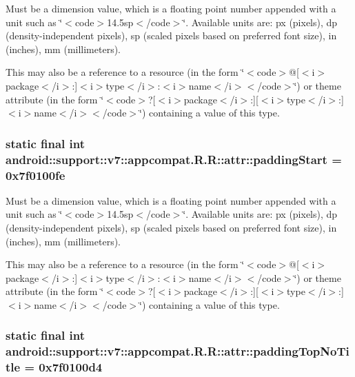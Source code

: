 Must be a dimension value, which is a floating point number appended with a unit such as \char`\"{}$<$code$>$14.5sp$<$/code$>$\char`\"{}. Available units are: px (pixels), dp (density-independent pixels), sp (scaled pixels based on preferred font size), in (inches), mm (millimeters). 

This may also be a reference to a resource (in the form \char`\"{}$<$code$>$@\mbox{[}$<$i$>$package$<$/i$>$:\mbox{]}$<$i$>$type$<$/i$>$:$<$i$>$name$<$/i$>$$<$/code$>$\char`\"{}) or theme attribute (in the form \char`\"{}$<$code$>$?\mbox{[}$<$i$>$package$<$/i$>$:\mbox{]}\mbox{[}$<$i$>$type$<$/i$>$:\mbox{]}$<$i$>$name$<$/i$>$$<$/code$>$\char`\"{}) containing a value of this type. \hypertarget{classandroid_1_1support_1_1v7_1_1appcompat_1_1_r_1_1attr_4bac40afcb95edc302f74bfa5df72085}{
\subsubsection[{paddingStart}]{\setlength{\rightskip}{0pt plus 5cm}static final int android::support::v7::appcompat.R.R::attr::paddingStart = 0x7f0100fe}}
\label{classandroid_1_1support_1_1v7_1_1appcompat_1_1_r_1_1attr_4bac40afcb95edc302f74bfa5df72085}


Must be a dimension value, which is a floating point number appended with a unit such as \char`\"{}$<$code$>$14.5sp$<$/code$>$\char`\"{}. Available units are: px (pixels), dp (density-independent pixels), sp (scaled pixels based on preferred font size), in (inches), mm (millimeters). 

This may also be a reference to a resource (in the form \char`\"{}$<$code$>$@\mbox{[}$<$i$>$package$<$/i$>$:\mbox{]}$<$i$>$type$<$/i$>$:$<$i$>$name$<$/i$>$$<$/code$>$\char`\"{}) or theme attribute (in the form \char`\"{}$<$code$>$?\mbox{[}$<$i$>$package$<$/i$>$:\mbox{]}\mbox{[}$<$i$>$type$<$/i$>$:\mbox{]}$<$i$>$name$<$/i$>$$<$/code$>$\char`\"{}) containing a value of this type. \hypertarget{classandroid_1_1support_1_1v7_1_1appcompat_1_1_r_1_1attr_95171e7be2d0a7c970308e339681f305}{
\subsubsection[{paddingTopNoTitle}]{\setlength{\rightskip}{0pt plus 5cm}static final int android::support::v7::appcompat.R.R::attr::paddingTopNoTitle = 0x7f0100d4}}
\label{classandroid_1_1support_1_1v7_1_1appcompat_1_1_r_1_1attr_95171e7be2d0a7c970308e339681f305}


